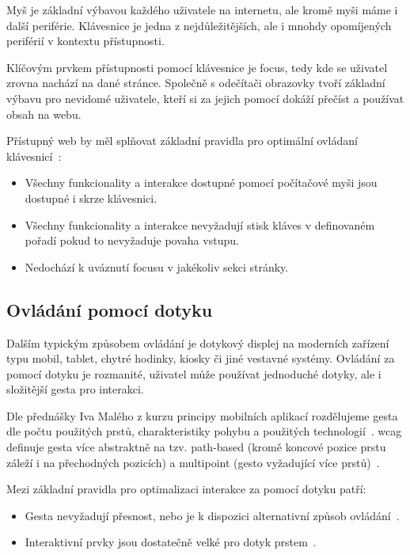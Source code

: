 Myš je základní výbavou každého uživatele na internetu, ale kromě myši máme i další periférie.
Klávesnice je jedna z nejdůležitějších, ale i mnohdy opomíjených periférií v kontextu přístupnosti.


Klíčovým prvkem přístupnosti pomocí klávesnice je focus, tedy kde se uživatel zrovna nachází na dané stránce.
Společně s odečítači obrazovky tvoří základní výbavu pro nevidomé uživatele, kteří si za jejich pomocí dokáží přečíst a používat obsah na webu.

Přístupný web by měl splňovat základní pravidla pro optimální ovládaní klávesnicí~\cite{wcag-keyboard}:

\begin{itemize}
    \item Všechny funkcionality a interakce dostupné pomocí počítačové myši jsou dostupné i skrze klávesnici.
    \item Všechny funkcionality a interakce nevyžadují stisk kláves v definovaném pořadí pokud to nevyžaduje povaha vstupu.
    \item Nedochází k uváznutí focusu v jakékoliv sekci stránky.
\end{itemize}

\subsection{Ovládání pomocí dotyku}

Dalším typickým způsobem ovládání je dotykový displej na moderních zařízení typu mobil, tablet, chytré hodinky, kiosky či jiné vestavné systémy.
Ovládání za pomocí dotyku je rozmanité, uživatel může používat jednoduché dotyky, ale i složitější gesta pro interakci.


Dle přednášky Iva Malého z kurzu principy mobilních aplikací rozdělujeme gesta dle počtu použitých prstů, charakteristiky pohybu a použitých technologií~\cite{ctu-pda-11}.
\gls{wcag} definuje gesta více abstraktně na tzv. path-based (kromě koncové pozice prstu záleží i na přechodných pozicích) a multipoint (gesto vyžadující více prstů)~\cite{wcag-pointer-gestures}.

Mezi základní pravidla pro optimalizaci interakce za pomocí dotyku patří:

\begin{itemize}
    \item Gesta nevyžadují přesnost, nebo je k dispozici alternativní způsob ovládání~\cite{wcag-pointer-gestures}.
    \item Interaktivní prvky jsou dostatečně velké pro dotyk prstem~\cite{wcag-target-size}.
\end{itemize}

